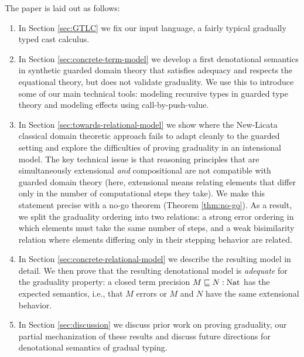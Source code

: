 The paper is laid out as follows:
\begin{enumerate}
\item In Section \ref{sec:GTLC} we fix our input language, a fairly
  typical gradually typed cast calculus.
\item In Section \ref{sec:concrete-term-model} we develop a first
  denotational semantics in synthetic guarded domain theory that
  satisfies adequacy and respects the equational theory, but does not
  validate graduality. We use this to introduce some of our main
  technical tools: modeling recursive types in guarded type theory and
  modeling effects using call-by-push-value.
\item In Section \ref{sec:towards-relational-model} we show where the
  New-Licata classical domain theoretic approach fails to adapt
  cleanly to the guarded setting and explore the difficulties of
  proving graduality in an intensional model.
  The key technical issue is that reasoning principles that are simultaneously
  extensional \emph{and} compositional are not compatible with guarded domain
  theory (here, extensional means relating elements that differ only in the
  number of computational steps they take). We make this statement precise with
  a no-go theorem (Theorem \ref{thm:no-go}). As a result, we split the
  graduality ordering into two relations: a strong error ordering in which
  elements must take the same number of steps, and a weak bisimilarity relation
  where elements differing only in their stepping behavior are related.
  
\item In Section \ref{sec:concrete-relational-model} we describe the resulting
  model in detail. We then prove that the resulting denotational model is
  \emph{adequate} for the graduality property: a closed term precision $M \sqsubseteq
  N : \text{Nat}$ has the expected semantics, i.e., that $M$ errors or $M$ and $N$ have the
  same extensional behavior.
\item In Section \ref{sec:discussion} we discuss prior work on proving
  graduality, our partial mechanization of these results and discuss
  future directions for denotational semantics of gradual typing.
\end{enumerate}
